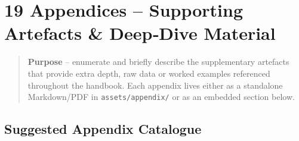 \documentclass[
  english,
]{article}
\begin{document}
\section{19 Appendices -- Supporting Artefacts \& Deep‑Dive
Material}\label{appendices-supporting-artefacts-deepdive-material}

\begin{quote}
\textbf{Purpose} -- enumerate and briefly describe the supplementary
artefacts that provide extra depth, raw data or worked examples
referenced throughout the handbook. Each appendix lives either as a
standalone Markdown/PDF in \texttt{assets/appendix/} or as an embedded
section below.
\end{quote}

\subsection{Suggested Appendix
Catalogue}\label{suggested-appendix-catalogue}
\end{document}
